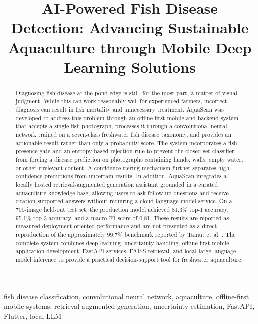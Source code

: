 \documentclass[conference]{IEEEtran}
\begin{document}
\title{AI-Powered Fish Disease Detection: Advancing Sustainable
Aquaculture through Mobile Deep Learning Solutions}

\maketitle

\begin{abstract}
Diagnosing fish disease at the pond edge is still, for the most part, a matter of visual judgment. While this can work reasonably well for experienced farmers, incorrect diagnosis can result in fish mortality and unnecessary treatment. AquaScan was developed to address this problem through an offline-first mobile and backend system that accepts a single fish photograph, processes it through a convolutional neural network trained on a seven-class freshwater fish disease taxonomy, and provides an actionable result rather than only a probability score. The system incorporates a fish-presence gate and an entropy-based rejection rule to prevent the closed-set classifier from forcing a disease prediction on photographs containing hands, walls, empty water, or other irrelevant content. A confidence-tiering mechanism further separates high-confidence predictions from uncertain results. In addition, AquaScan integrates a locally hosted retrieval-augmented generation assistant grounded in a curated aquaculture knowledge base, allowing users to ask follow-up questions and receive citation-supported answers without requiring a cloud language-model service. On a 700-image held-out test set, the production model achieved 81.3\% top-1 accuracy, 95.1\% top-3 accuracy, and a macro F1-score of 0.81. These results are reported as measured deployment-oriented performance and are not presented as a direct reproduction of the approximately 99.7\% benchmark reported by Tamut et al. \cite{b1}. The complete system combines deep learning, uncertainty handling, offline-first mobile application development, FastAPI services, FAISS retrieval, and local large language model inference to provide a practical decision-support tool for freshwater aquaculture.
\end{abstract}

\begin{IEEEkeywords}
fish disease classification, convolutional neural network, aquaculture, offline-first mobile systems, retrieval-augmented generation, uncertainty estimation, FastAPI, Flutter, local LLM
\end{IEEEkeywords}
\end{document}
